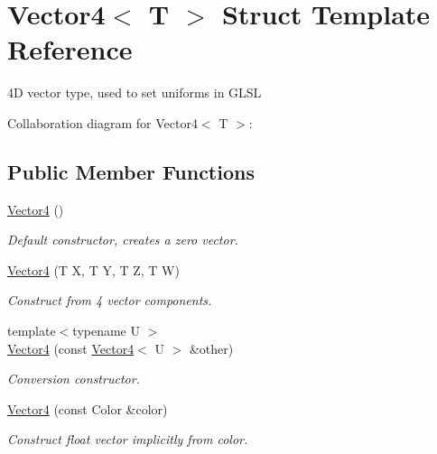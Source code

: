 \hypertarget{struct_vector4}{}\section{Vector4$<$ T $>$ Struct Template Reference}
\label{struct_vector4}


4D vector type, used to set uniforms in G\+L\+SL  




Collaboration diagram for Vector4$<$ T $>$\+:
\subsection*{Public Member Functions}
\begin{DoxyCompactItemize}
\item 
\mbox{\label{struct_vector4_afdef97d94e5697622b5322637028accf}} 
\hyperlink{struct_vector4_afdef97d94e5697622b5322637028accf}{Vector4} ()
\begin{DoxyCompactList}\small\item\em Default constructor, creates a zero vector. \end{DoxyCompactList}\item 
\hyperlink{struct_vector4_ae099ed0a6d7d78ed38ac023d0e4cec25}{Vector4} (T X, T Y, T Z, T W)
\begin{DoxyCompactList}\small\item\em Construct from 4 vector components. \end{DoxyCompactList}\item 
{\footnotesize template$<$typename U $>$ }\\\hyperlink{struct_vector4_a6413d8b504d7fdfbb600a0caf9c90cc2}{Vector4} (const \hyperlink{struct_vector4}{Vector4}$<$ U $>$ \&other)
\begin{DoxyCompactList}\small\item\em Conversion constructor. \end{DoxyCompactList}\item 
\hyperlink{struct_vector4_af1da65a743ddbb5c779b41eae766c00d}{Vector4} (const Color \&color)
\begin{DoxyCompactList}\small\item\em Construct float vector implicitly from color. \end{DoxyCompactList}\end{DoxyCompactItemize}
